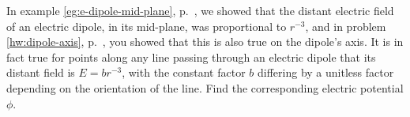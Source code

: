 In example \ref{eg:e-dipole-mid-plane},
p.~\pageref{eg:e-dipole-mid-plane}, we showed that the distant electric field
of an electric dipole, in its mid-plane, was proportional to $r^{-3}$,
and in problem
\ref{hw:dipole-axis}, p.~\pageref{hw:dipole-axis}, you showed that this
is also true on the dipole's axis. It is in fact true for points along any line
passing through an electric dipole that its distant field is $E=br^{-3}$,
with the constant factor $b$ differing by a unitless factor depending on the
orientation of the line. Find the corresponding electric potential $\phi$.

